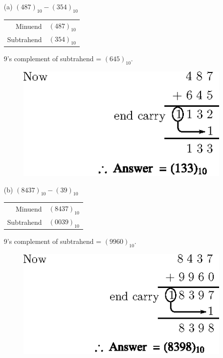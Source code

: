 \begin{solution}
\begin{itemize}
\item[(a)] $(487)_{10}-(354)_{10}$
\begin{center}
\begin{tabular}{r@{\;=\;}l}
Minuend & $(487)_{10}$\\
Subtrahend & $(354)_{10}$
\end{tabular}
\end{center}
9's complement of subtrahend = $(645)_{10}$.
\begin{figure}[H]
\centering
\includegraphics{chap5/div53.eps}
\end{figure}

\item[(b)] $(8437)_{10}-(39)_{10}$
\begin{center}
\begin{tabular}{r@{\;=\;}l}
Minuend & $(8437)_{10}$\\
Subtrahend & $(0039)_{10}$
\end{tabular}
\end{center}
9's complement of subtrahend = $(9960)_{10}$.
\begin{figure}[H]
\centering
\includegraphics{chap5/div54.eps}
\end{figure}


\end{itemize}
\end{solution}
